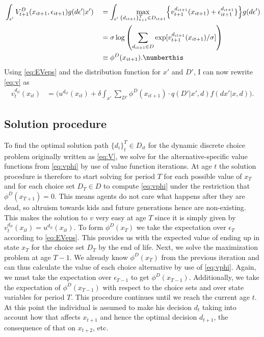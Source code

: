 \begin{alignat*}{3}
&\int_{\epsilon'}{ V_{t+1}^D (x_{it+1},\epsilon_{it+1})g(d\epsilon'|x')} &&= \int_{\epsilon'}{ \max_{\{d_{it+1}\}_{t+1}^{T}\in D_{it+1}} } \Big\{v_{t+1}^{d_{it+1}}(x_{it+1}) +\epsilon_{it+1}^{d_{it+1}}\} \Big\}g(d\epsilon') \\
& &&=\sigma \log {\left( \sum_{d_{it+1} \in D} { \exp[v_{t+1}^{d_{it+1}}(x_{it+1})/ \sigma]  } \right)} \\
& &&\equiv\phi^D(x_{it+1}). \numberthis
\label{eq:EVeps}
\end{alignat*}
Using \eqref{eq:EVeps} and the distribution function for $x'$ and $D'$, I can now rewrite \eqref{eq:v} as
\begin{align}
v_t^{d_{it}}(x_{it})&=\Big(u^{d_{it}}(x_{it}) +\delta \int_{x'} \sum_{D'}{\phi^D(x_{it+1})\cdot q(D'|x',d)f(dx'|x,d)}\Big).  \label{eq:vphi}
\end{align}

\subsection{Solution procedure}
To find the optimal solution path $\{d_{i}\}_{t}^{T}\in D_{it}$ for the dynamic discrete choice problem originally written as \eqref{eq:V}, we solve for the alternative-specific value functions from \eqref{eq:vphi} by use of value function iterations. At age $t$ the solution procedure is therefore to start solving for period $T$ for each possible value of $x_T$ and for each choice set $D_T\in D$ to compute \eqref{eq:vphi} under the restriction that $\phi^D(x_{T+1})=0$. This means agents do not care what happens after they are dead, so altruism towards kids and future generations hence are non-existing. This makes the solution to $v$ very easy at age $T$ since it is simply given by  $v_t^{d_{it}}(x_{it})= u^{d_{it}}(x_{it})$. To form $\phi^D(x_T)$ we take the expectation over $\epsilon_T$ according to \eqref{eq:EVeps}. This provides us with the expected value of ending up in state $x_T$ for the choice set $D_T$ by the end of life. Next, we solve the maximization problem at age $T-1$. We already know $\phi^D(x_T)$ from the previous iteration and can thus calculate the value of each choice alternative by use of \eqref{eq:vphi}. Again, we must take the expectation over $\epsilon_{T-1}$ to get $\phi^D(x_{T-1})$. Additionally, we take the expectation of $\phi^D(x_{T-1})$ with respect to the choice sets and over state variables for period $T$. This procedure continues until we reach the current age $t$. At this point the individual is assumed to make his decision $d_{t}$ taking into account how that affects $x_{t+1}$ and hence the optimal decision $d_{t+1}$, the consequence of that on $x_{t+2}$, etc. 


